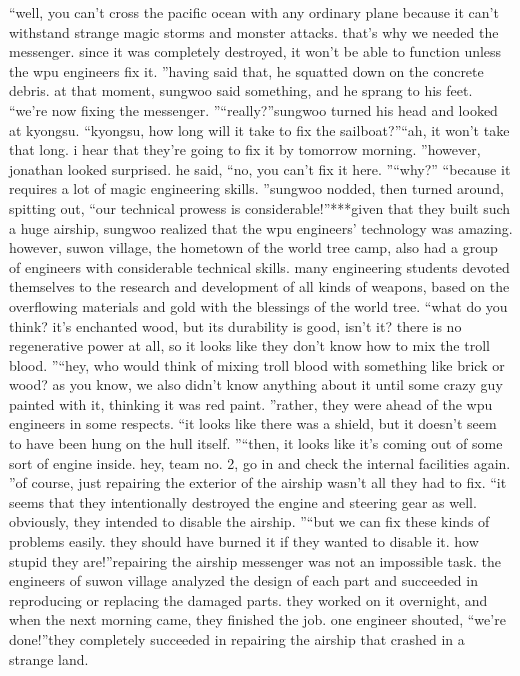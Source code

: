 “well, you can’t cross the pacific ocean with any ordinary plane because it can’t withstand strange magic storms and monster attacks.
 that’s why we needed the messenger.
 since it was completely destroyed, it won’t be able to function unless the wpu engineers fix it.
”having said that, he squatted down on the concrete debris.
at that moment, sungwoo said something, and he sprang to his feet.
“we’re now fixing the messenger.
”“really?”sungwoo turned his head and looked at kyongsu.
“kyongsu, how long will it take to fix the sailboat?”“ah, it won’t take that long.
 i hear that they’re going to fix it by tomorrow morning.
”however, jonathan looked surprised.
he said, “no, you can’t fix it here.
”“why?”
“because it requires a lot of magic engineering skills.
”sungwoo nodded, then turned around, spitting out, “our technical prowess is considerable!”***given that they built such a huge airship, sungwoo realized that the wpu engineers’ technology was amazing.
 however, suwon village, the hometown of the world tree camp, also had a group of engineers with considerable technical skills.
 many engineering students devoted themselves to the research and development of all kinds of weapons, based on the overflowing materials and gold with the blessings of the world tree.
“what do you think? it’s enchanted wood, but its durability is good, isn’t it? there is no regenerative power at all, so it looks like they don’t know how to mix the troll blood.
”“hey, who would think of mixing troll blood with something like brick or wood? as you know, we also didn’t know anything about it until some crazy guy painted with it, thinking it was red paint.
”rather, they were ahead of the wpu engineers in some respects.
“it looks like there was a shield, but it doesn’t seem to have been hung on the hull itself.
”“then, it looks like it’s coming out of some sort of engine inside.
 hey, team no.
 2, go in and check the internal facilities again.
 ”of course, just repairing the exterior of the airship wasn’t all they had to fix.
“it seems that they intentionally destroyed the engine and steering gear as well.
 obviously, they intended to disable the airship.
”“but we can fix these kinds of problems easily.
 they should have burned it if they wanted to disable it.
 how stupid they are!”repairing the airship messenger was not an impossible task.
 the engineers of suwon village analyzed the design of each part and succeeded in reproducing or replacing the damaged parts.
they worked on it overnight, and when the next morning came, they finished the job.
one engineer shouted, “we’re done!”they completely succeeded in repairing the airship that crashed in a strange land.
